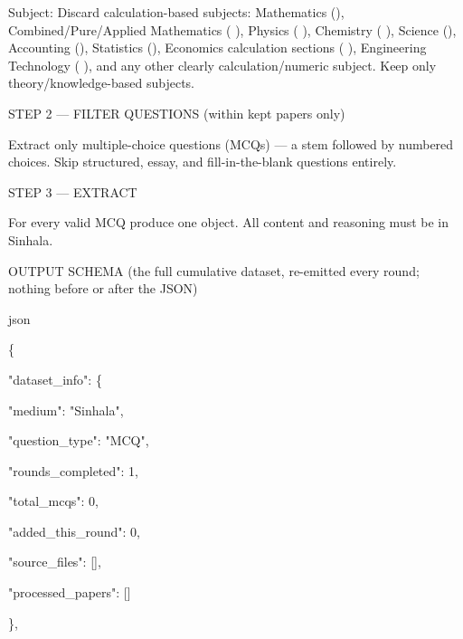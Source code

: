 Subject: Discard calculation-based subjects: Mathematics (), Combined/Pure/Applied Mathematics ( ), Physics ( ), Chemistry ( ), Science (), Accounting (), Statistics (), Economics calculation sections ( ), Engineering Technology ( ), and any other clearly calculation/numeric subject. Keep only theory/knowledge-based subjects.

\medskip

STEP 2 — FILTER QUESTIONS (within kept papers only)

Extract only multiple-choice questions (MCQs) — a stem followed by numbered choices. Skip structured, essay, and fill-in-the-blank questions entirely.

\medskip

STEP 3 — EXTRACT

For every valid MCQ produce one object. All content and reasoning must be in Sinhala.

\medskip

OUTPUT SCHEMA (the full cumulative dataset, re-emitted every round; nothing before or after the JSON)

\medskip

json

\{

\hspace*{1.0em}"dataset\_info": \{

\hspace*{2.0em}"medium": "Sinhala",

\hspace*{2.0em}"question\_type": "MCQ",

\hspace*{2.0em}"rounds\_completed": 1,

\hspace*{2.0em}"total\_mcqs": 0,

\hspace*{2.0em}"added\_this\_round": 0,

\hspace*{2.0em}"source\_files": [],

\hspace*{2.0em}"processed\_papers": []

\hspace*{1.0em}\},

